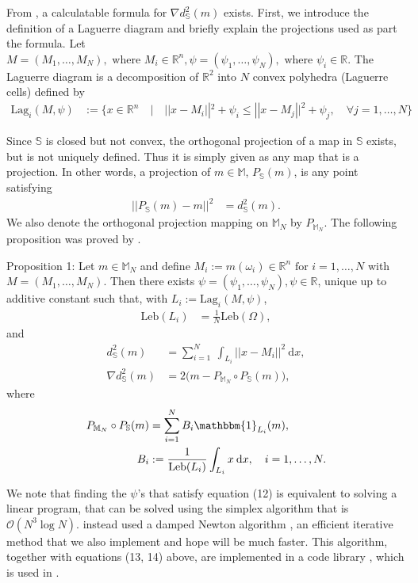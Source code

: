 \documentclass[11pt, oneside]{article}   	%
\newcommand{\R}{\mathbb{R}}
\newcommand{\MN}{\mathbb{M}_N}
\newcommand{\dsmsq}{d^{2}_{\mathbb{S}}(m)}
\newcommand{\graddsmsq}{\nabla{d^{2}_{\mathbb{S}}(m)}}
\newcommand{\M}{\mathbb{M}}
\newcommand{\Sb}{\mathbb{S}}
\newcommand{\Leb}{\mathrm{Leb}}
\begin{document}
From \cite{gallouet2016lagrangian}, a calculatable formula for \(\graddsmsq\) exists. First, we introduce the definition of a Laguerre diagram and briefly explain the projections used as part the formula. Let \(M = (M_1,\dots,M_N), \text{ where } M_i \in \R^n, \psi = (\psi_1,\dots,\psi_N), \text{ where } \psi_i \in \R\). The Laguerre diagram is a decomposition of \(\R^2\) into \(N\) convex polyhedra (Laguerre cells) defined by
\begin{align}
\mathrm{Lag}_i(M, \psi) &:= \Big\{ x \in \R^n \quad | \quad || x - M_i ||^2 + \psi_i \le || x - M_j ||^2 + \psi_j, \quad \forall j = 1,\dots,N \Big\}
\end{align}

Since \(\Sb\) is closed but not convex, the orthogonal projection of a map in \(\Sb\) exists, but is not uniquely defined. Thus it is simply given as any map that is a projection. In other words, a projection of \(m \in \M\), \(P_\Sb(m)\), is any point satisfying
\begin{align}
|| P_\Sb(m) - m ||^2 &= \dsmsq.
\end{align}
We also denote the orthogonal projection mapping on \(\MN\) by \(P_{\MN}\). The following proposition was proved by \cite{gallouet2016lagrangian}.

Proposition 1: Let \(m \in \MN\) and define \(M_i := m(\omega_i) \in \R^n \text{ for } i = 1,\dots,N\) with \(M = (M_1,\dots,M_N)\). Then there exists \(\psi = (\psi_1,\dots,\psi_N), \psi \in \R\), unique up to additive constant such that, with \(L_i := \mathrm{Lag}_i(M, \psi)\), 
\begin{align}
\Leb(L_i) &= \frac{1}{N}\Leb(\Omega),
\end{align}
and
\begin{align}
\dsmsq & = \sum_{i=1}^N \: \int_{L_i} || x - M_i ||^2 \: \mathrm{d}x, \\
\graddsmsq &= 2 \big( m - P_{\MN} \circ P_{\mathbb{S}}(m) \big),
\end{align}
where
\begin{align}
P_{\MN} \circ P_{\mathbb{S}}(m) &= \sum^N_{i=1} B_i \mathbbm{1}_{L_i}(m), \\
B_i &:= \frac{1}{\Leb(L_i)} \int_{L_i} x \: \mathrm{d}x, \quad i = 1,\dots,N. 
\end{align}

We note that finding the \(\psi\)'s that satisfy equation (12) is equivalent to solving a linear program, that can be solved using the simplex algorithm that is \(\mathcal{O}(N^3\log N)\). \cite{gallouet2016lagrangian} instead used a damped Newton algorithm \citep{merigot2017algorithm}, an efficient iterative method that we also implement and hope will be much faster. This algorithm, together with equations (13, 14) above, are implemented in a code library \citep{merigotpymongeampere}, which is used in \cite{gallouet2016lagrangian}. 
\end{document}
